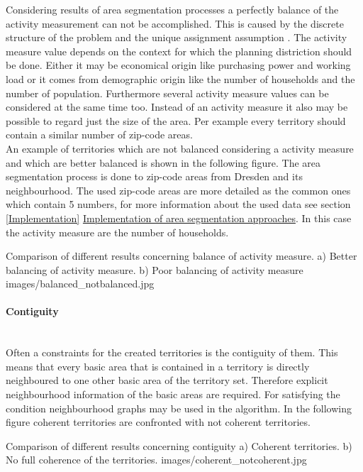 Considering results of area segmentation processes a perfectly balance of the activity measurement can not be accomplished. This is caused by the discrete structure of the problem and the unique assignment assumption \cite{kalcsics}. The activity measure value depends on the context for which the planning distriction should be done. Either it may be economical origin like purchasing power and working load or it comes from demographic origin like the number of households and the number of population. Furthermore several activity measure values can be considered at the same time too. Instead of an activity measure it also may be possible to regard just the size of the area. Per example every territory should contain a similar number of zip-code areas.\\
An example of territories which are not balanced considering a activity measure and which are better balanced is shown in the following figure. The area segmentation process is done to zip-code areas from Dresden and its neighbourhood. The used zip-code areas are more detailed as the common ones which contain 5 numbers, for more information about the used data see section \ref{Implementation} \hyperref[Implementation]{Implementation of area segmentation approaches}. In this case the activity measure are the number of households.

\begin{figureOwn}{Comparison of different results concerning balance of activity measure. a) Better balancing of activity measure. b) Poor balancing of activity measure }{images/balanced_notbalanced.jpg}\end{figureOwn}


\paragraph{Contiguity}\mbox{} \\

Often a constraints for the created territories is the contiguity of them. This means that every basic area that is contained in a territory is directly neighboured to one other basic area of the territory set. Therefore explicit neighbourhood information of the basic areas are required. For satisfying the condition neighbourhood graphs may be used in the algorithm. In the following figure coherent territories are confronted with not coherent territories.

\begin{figureOwn}{Comparison of different results concerning contiguity a) Coherent territories. b) No full coherence of the territories. }{images/coherent_notcoherent.jpg}\end{figureOwn} 

